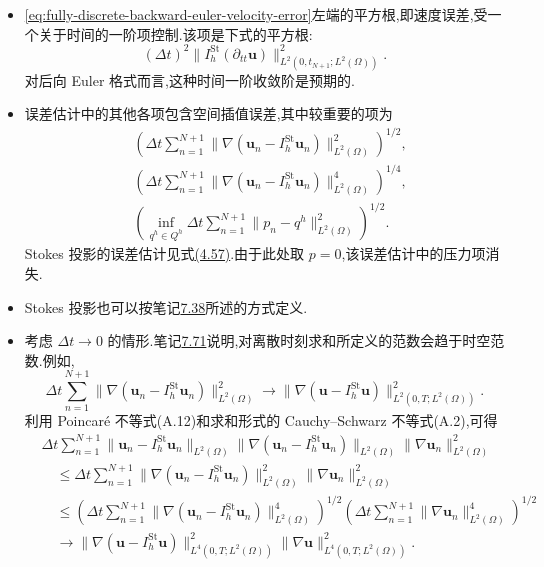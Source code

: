 \begin{note}[关于误差估计(7.107)]\label{note:fully-discrete-backward-euler-error-estimate}
\begin{itemize}
\item
\cref{eq:fully-discrete-backward-euler-velocity-error}左端的平方根,即速度误差,受一个关于时间的一阶项控制.该项是下式的平方根:
\[
 (\Delta t)^2
 \|I_h^{\mathrm{St}}(\partial_{tt}\bm{u})\|
 _{L^2(0,t_{N+1};L^2(\Omega))}^2.
\]
对后向 Euler 格式而言,这种时间一阶收敛阶是预期的.

\item
误差估计中的其他各项包含空间插值误差,其中较重要的项为
\[
\begin{aligned}
 &\left(\Delta t\sum_{n=1}^{N+1}
   \|\nabla(\bm{u}_n-I_h^{\mathrm{St}}\bm{u}_n)\|_{L^2(\Omega)}^2
   \right)^{1/2},\\
 &\left(\Delta t\sum_{n=1}^{N+1}
   \|\nabla(\bm{u}_n-I_h^{\mathrm{St}}\bm{u}_n)\|_{L^2(\Omega)}^4
   \right)^{1/4},\\
 &\left(\inf_{q^h\in Q^h}\Delta t\sum_{n=1}^{N+1}
   \|p_n-q^h\|_{L^2(\Omega)}^2\right)^{1/2}.
\end{aligned}
\]
Stokes 投影的误差估计见式\hyperref[eq:stokes-projection-best-approximation-velocity]{(4.57)}.由于此处取 $p=0$,该误差估计中的压力项消失.

\item
Stokes 投影也可以按笔记\hyperref[note:time-dependent-fem-error-proof]{7.38}所述的方式定义.

\item
考虑 $\Delta t\to0$ 的情形.笔记\hyperref[note:time-space-norm-approximation]{7.71}说明,对离散时刻求和所定义的范数会趋于时空范数.例如,
\[
 \Delta t\sum_{n=1}^{N+1}
   \|\nabla(\bm{u}_n-I_h^{\mathrm{St}}\bm{u}_n)\|_{L^2(\Omega)}^2
 \longrightarrow
   \|\nabla(\bm{u}-I_h^{\mathrm{St}}\bm{u})\|
      _{L^2(0,T;L^2(\Omega))}^2.
\]
利用 Poincaré 不等式(A.12)和求和形式的 Cauchy--Schwarz 不等式(A.2),可得
\[
\begin{aligned}
 &\Delta t\sum_{n=1}^{N+1}
   \|\bm{u}_n-I_h^{\mathrm{St}}\bm{u}_n\|_{L^2(\Omega)}
   \|\nabla(\bm{u}_n-I_h^{\mathrm{St}}\bm{u}_n)\|_{L^2(\Omega)}
   \|\nabla\bm{u}_n\|_{L^2(\Omega)}^2\\
 &\quad\le \Delta t\sum_{n=1}^{N+1}
   \|\nabla(\bm{u}_n-I_h^{\mathrm{St}}\bm{u}_n)\|_{L^2(\Omega)}^2
   \|\nabla\bm{u}_n\|_{L^2(\Omega)}^2\\
 &\quad\le
   \left(\Delta t\sum_{n=1}^{N+1}
     \|\nabla(\bm{u}_n-I_h^{\mathrm{St}}\bm{u}_n)\|_{L^2(\Omega)}^4\right)^{1/2}
   \left(\Delta t\sum_{n=1}^{N+1}
     \|\nabla\bm{u}_n\|_{L^2(\Omega)}^4\right)^{1/2}\\
 &\quad\longrightarrow
   \|\nabla(\bm{u}-I_h^{\mathrm{St}}\bm{u})\|
      _{L^4(0,T;L^2(\Omega))}^2
   \|\nabla\bm{u}\|_{L^4(0,T;L^2(\Omega))}^2.
\end{aligned}
\]


\end{itemize}
\end{note}
